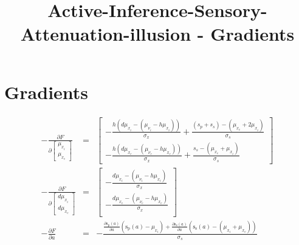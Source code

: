 \documentclass[11pt]{article}
\title{Active-Inference-Sensory-Attenuation-illusion - Gradients}
\begin{document}
\maketitle

\section*{Gradients}

$$
\begin{array}{lll}
  - \frac{\partial F}{\partial \left[\begin{matrix}\mu_{x_i}
    \\\mu_{x_e}\end{matrix} \right]} &=& \left[\begin{matrix} -\frac{
    h(d\mu_{x_i} - ( \mu_{\nu_i} - h \mu_{x_i}))}{\sigma_x} + \frac{(s_{p} +
    s_{s}) - (\mu_{x_e} + 2 \mu_{x_i}) }{\sigma_s}\\ -\frac{ h(d\mu_{x_e} - (
    \mu_{\nu_e} - h \mu_{x_e}))}{\sigma_x} + \frac{s_{s} - (\mu_{x_e} +
    \mu_{x_i}) }{\sigma_s} \end{matrix}\right] \\
  - \frac{\partial F}{\partial \left[\begin{matrix}d\mu_{x_i}\\
    d\mu_{x_e}\end{matrix}\right]} &=& \left[\begin{matrix} -\frac{ d\mu_{x_i} -
    ( \mu_{\nu_i} - h \mu_{x_i})}{\sigma_x} \\ -\frac{ d\mu_{x_e} - (
    \mu_{\nu_e} - h \mu_{x_e})}{\sigma_x} \\ \end{matrix}\right] \\
- \frac{\partial F}{\partial a} &=& - \frac{
  \frac{\partial\operatorname{s_{p}}{\left(a \right)}}{\partial a}\left(
  \operatorname{s_{p}}{\left(a \right)} - \mu_{x_i} \right) +
  \frac{\partial\operatorname{s_{s}}{\left(a \right)}}{\partial a}\left(
  \operatorname{s_{s}}{\left(a \right)} - (\mu_{x_i} + \mu_{x_e}) \right)
}
{\sigma_s}
\end{array}
$$
\end{document}
